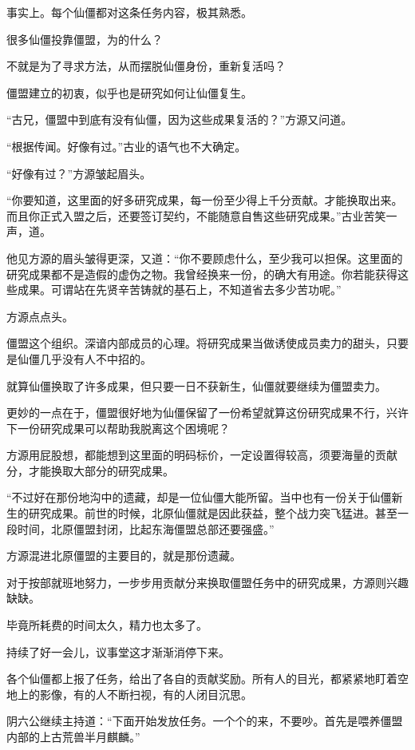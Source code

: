 \begin{this_body}
事实上。每个仙僵都对这条任务内容，极其熟悉。

很多仙僵投靠僵盟，为的什么？

不就是为了寻求方法，从而摆脱仙僵身份，重新复活吗？

僵盟建立的初衷，似乎也是研究如何让仙僵复生。

“古兄，僵盟中到底有没有仙僵，因为这些成果复活的？”方源又问道。

“根据传闻。好像有过。”古业的语气也不大确定。

“好像有过？”方源皱起眉头。

“你要知道，这里面的好多研究成果，每一份至少得上千分贡献。才能换取出来。而且你正式入盟之后，还要签订契约，不能随意自售这些研究成果。”古业苦笑一声，道。

他见方源的眉头皱得更深，又道：“你不要顾虑什么，至少我可以担保。这里面的研究成果都不是造假的虚伪之物。我曾经换来一份，的确大有用途。你若能获得这些成果。可谓站在先贤辛苦铸就的基石上，不知道省去多少苦功呢。”

方源点点头。

僵盟这个组织。深谙内部成员的心理。将研究成果当做诱使成员卖力的甜头，只要是仙僵几乎没有人不中招的。

就算仙僵换取了许多成果，但只要一日不获新生，仙僵就要继续为僵盟卖力。

更妙的一点在于，僵盟很好地为仙僵保留了一份希望就算这份研究成果不行，兴许下一份研究成果可以帮助我脱离这个困境呢？

方源用屁股想，都能想到这里面的明码标价，一定设置得较高，须要海量的贡献分，才能换取大部分的研究成果。

“不过好在那份地沟中的遗藏，却是一位仙僵大能所留。当中也有一份关于仙僵新生的研究成果。前世的时候，北原仙僵就是因此获益，整个战力突飞猛进。甚至一段时间，北原僵盟封闭，比起东海僵盟总部还要强盛。”

方源混进北原僵盟的主要目的，就是那份遗藏。

对于按部就班地努力，一步步用贡献分来换取僵盟任务中的研究成果，方源则兴趣缺缺。

毕竟所耗费的时间太久，精力也太多了。

持续了好一会儿，议事堂这才渐渐消停下来。

各个仙僵都上报了任务，给出了各自的贡献奖励。所有人的目光，都紧紧地盯着空地上的影像，有的人不断扫视，有的人闭目沉思。

阴六公继续主持道：“下面开始发放任务。一个个的来，不要吵。首先是喂养僵盟内部的上古荒兽半月麒麟。”


\end{this_body}
